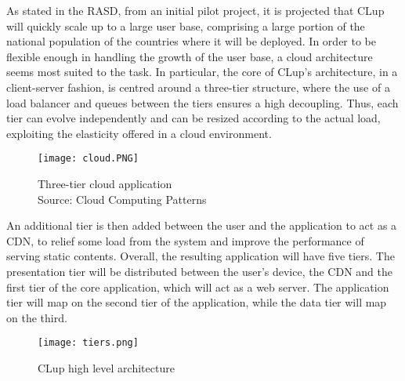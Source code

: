 \documentclass[../../main.tex]{subfiles}
\begin{document}
As stated in the RASD, from an initial pilot project, it is projected that CLup will quickly scale up to a large user base, 
comprising a large portion of the national population of the countries where it will be deployed. 
In order to be flexible enough in handling the growth of the user base, a cloud architecture seems most suited to the task. 
In particular, the core of CLup's architecture, in a client-server fashion, is centred around a three-tier structure, where the use of a load balancer 
and queues between the tiers ensures a high decoupling. 
Thus, each tier can evolve independently and can be resized according to the actual load, 
exploiting the elasticity offered in a cloud environment.

\begin{figure}[H]
    \centering
    \texttt{[image: cloud.PNG]}
    \caption{
        Three-tier cloud application\\
        Source: Cloud Computing Patterns
    }
\end{figure}

An additional tier is then added between the user and the application to act as a CDN, to relief some load from the system and improve the performance of serving static contents. Overall,
 the resulting application will have five tiers.
The presentation tier will be distributed between the user's device, the CDN and the first tier of the core application, which will act as a web server. The application tier will map on the second tier of the application, while the data tier will map on the third.


\begin{figure}[H]
    \centering
    \texttt{[image: tiers.png]}
    \caption{
        CLup high level architecture
    }
\end{figure}
\end{document}
